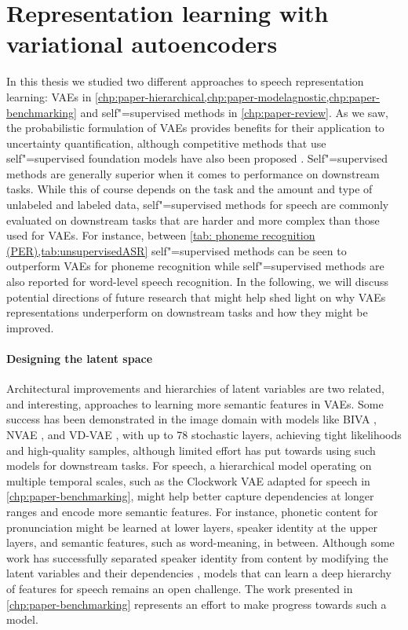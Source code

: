 \section{Representation learning with variational autoencoders}
%
In this thesis we studied two different approaches to speech representation learning: VAEs in \cref{chp:paper-hierarchical,chp:paper-modelagnostic,chp:paper-benchmarking} and self"=supervised methods in \cref{chp:paper-review}. 
As we saw, the probabilistic formulation of VAEs provides benefits for their application to uncertainty quantification, although competitive methods that use self"=supervised foundation models have also been proposed \textcite{xiao_we_2021,hendrycks_using_2019,bergman_classificationbased_2020}. Self"=supervised methods are generally superior when it comes to performance on downstream tasks. While this of course depends on the task and the amount and type of unlabeled and labeled data, self"=supervised methods for speech are commonly evaluated on downstream tasks that are harder and more complex than those used for VAEs. For instance, between \cref{tab: phoneme recognition (PER),tab:unsupervisedASR} self"=supervised methods can be seen to outperform VAEs for phoneme recognition while self"=supervised methods are also reported for word-level speech recognition. 
In the following, we will discuss potential directions of future research that might help shed light on why VAEs representations underperform on downstream tasks and how they might be improved.


\paragraph{Designing the latent space} 
Architectural improvements and hierarchies of latent variables are two related, and interesting, approaches to learning more semantic features in VAEs. 
Some success has been demonstrated in the image domain with models like BIVA \parencite{maaloe_biva_2019}, NVAE \parencite{vahdat_nvae_2020}, and VD-VAE \parencite{child_very_2021}, with up to 78 stochastic layers, achieving tight likelihoods and high-quality samples, although limited effort has put towards using such models for downstream tasks. 
For speech, a hierarchical model operating on multiple temporal scales, such as the Clockwork VAE \parencite{saxena_clockwork_2021} adapted for speech in \cref{chp:paper-benchmarking}, might help better capture dependencies at longer ranges and encode more semantic features. 
For instance, phonetic content for pronunciation might be learned at lower layers, speaker identity at the upper layers, and semantic features, such as word-meaning, in between. 
Although some work has successfully separated speaker identity from content by modifying the latent variables and their dependencies \parencite{hsu_unsupervised_2017}, models that can learn a deep hierarchy of features for speech remains an open challenge. The work presented in \cref{chp:paper-benchmarking} represents an effort to make progress towards such a model. 


